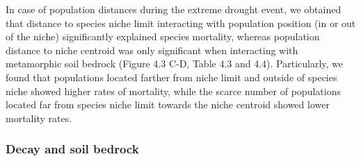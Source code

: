 \documentclass[11pt,twoside]{reedthesis}
\begin{document}
In case of population distances during the extreme drought event, we
obtained that distance to species niche limit interacting with
population position (in or out of the niche) significantly explained
species mortality, whereas population distance to niche centroid was
only significant when interacting with metamorphic soil bedrock (Figure
4.3 C-D, Table 4.3 and 4.4). Particularly, we found that populations
located farther from niche limit and outside of species niche showed
higher rates of mortality, while the scarce number of populations
located far from species niche limit towards the niche centroid showed
lower mortality rates.\par

\subsubsection{Decay and soil bedrock}\label{decay-and-soil-bedrock}
\end{document}
